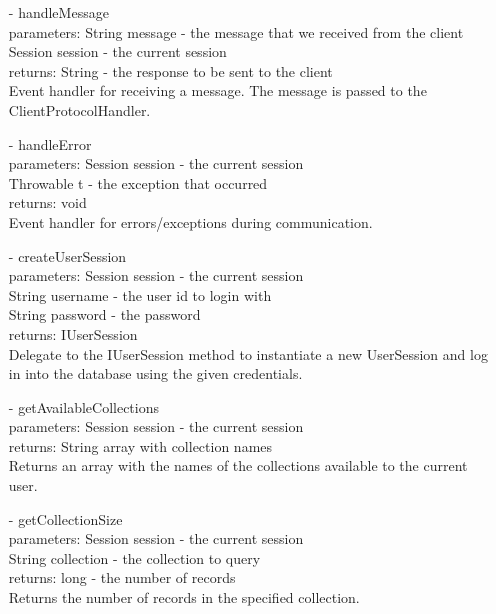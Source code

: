 \documentclass[oneside, english, final]{design}
\begin{document}
\begin{itemize}
\begin{itemize}
		      \item[-]handleMessage
		            \\parameters: String message - the message that we received from the client
		            \\Session session - the current session
		            \\returns: String - the response to be sent to the client
		            \\Event handler for receiving a message. The message is passed to the ClientProtocolHandler.

		      \item[-]handleError
		            \\parameters: Session session - the current session
		            \\Throwable t - the exception that occurred
		            \\returns: void
		            \\Event handler for errors/exceptions during communication.
		      \item[-]createUserSession
		            \\parameters: Session session - the current session
		            \\String username - the user id to login with
		            \\String password - the password
		            \\returns: IUserSession
		            \\Delegate to the IUserSession method to instantiate a new UserSession and log in into the database using the given credentials.

		      \item[-]getAvailableCollections
		            \\parameters: Session session - the current session
		            \\returns: String array with collection names
		            \\Returns an array with the names of the collections available to the current user.

		      \item[-]getCollectionSize
		            \\parameters: Session session - the current session
		            \\String collection - the collection to query
		            \\returns: long - the number of records
		            \\Returns the number of records in the specified collection.


\end{itemize}
\end{itemize}
\end{document}
